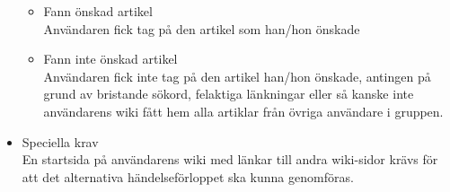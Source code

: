\begin{itemize}
	\begin{itemize}
	\item Fann önskad artikel
	\\Användaren fick tag på den artikel som han/hon önskade
	\item Fann inte önskad artikel
	\\Användaren fick inte tag på den artikel han/hon önskade, antingen på grund av bristande sökord, felaktiga länkningar eller så kanske inte användarens wiki fått hem alla artiklar från övriga användare i gruppen.
	\end{itemize}
	\item Speciella krav
	\\En startsida på användarens wiki med länkar till andra wiki-sidor krävs för att det alternativa händelseförloppet ska kunna genomföras.
\end{itemize}

